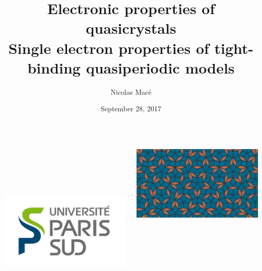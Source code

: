 \begin{frame}
\title{Electronic properties of quasicrystals \\ {\fontsize{10}{60}\selectfont Single electron properties of tight-binding quasiperiodic models}}

\author{Nicolas Macé}


\date{September 28, 2017}

\titlepage

\btVFill
\begin{columns}
\begin{column}{2cm}
~\\
~\\
~\\
~\\
\raggedright
\includegraphics[scale=.15]{img/0_cover/LogoUPSUD.png}
\end{column}
\begin{column}{6cm}
\centering
\includegraphics[width=.8\textwidth]{img/0_cover/cover.png}
\end{column}

\end{columns}
\end{frame}
